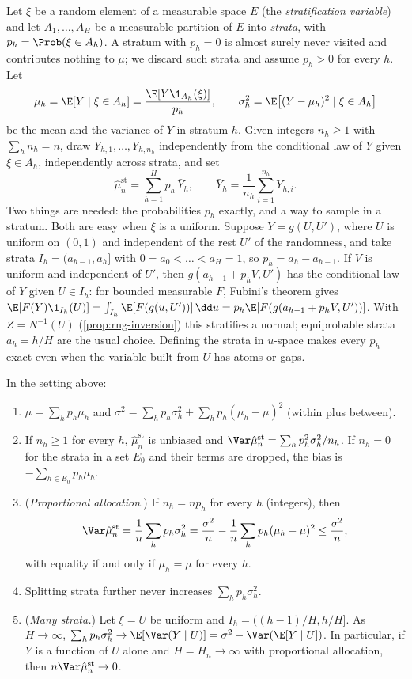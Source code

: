 Let $\xi$ be a random element of a measurable space $E$ (the \emph{stratification
variable}) and let $A_1,\dots,A_H$ be a measurable partition of $E$ into \emph{strata}, with
$p_h=\Prob(\xi\in A_h)$. A stratum with $p_h=0$ is almost surely never visited and
contributes nothing to $\mu$; we discard such strata and assume $p_h>0$ for every $h$. Let
\[
  \mu_h=\E[Y\mid\xi\in A_h]=\frac{\E[Y\1_{A_h}(\xi)]}{p_h},\qquad
  \sigma_h^2=\E\big[(Y-\mu_h)^2\mid\xi\in A_h\big]
\]
be the mean and the variance of $Y$ in stratum $h$. Given integers $n_h\ge1$ with
$\sum_hn_h=n$, draw $Y_{h,1},\dots,Y_{h,n_h}$ independently from the conditional law of $Y$
given $\xi\in A_h$, independently across strata, and set
\begin{equation}\label{eq:st-estimator}
  \hat\mu^{\mathrm{st}}_n=\sum_{h=1}^Hp_h\,\bar Y_h,\qquad \bar Y_h=\frac1{n_h}\sum_{i=1}^{n_h}Y_{h,i}.
\end{equation}
Two things are needed: the probabilities $p_h$ exactly, and a way to sample in a stratum.
Both are easy when $\xi$ is a uniform. Suppose $Y=g(U,U')$, where $U$ is uniform on $(0,1)$
and independent of the rest $U'$ of the randomness, and take strata
$I_h=(a_{h-1},a_h]$ with $0=a_0<\dots<a_H=1$, so $p_h=a_h-a_{h-1}$. If $V$ is uniform and
independent of $U'$, then $g(a_{h-1}+p_hV,U')$ has the conditional law of $Y$ given
$U\in I_h$: for bounded measurable $F$, Fubini's theorem gives
$\E[F(Y)\1_{I_h}(U)]=\int_{I_h}\E[F(g(u,U'))]\,\dd u=p_h\E[F(g(a_{h-1}+p_hV,U'))]$. With
$Z=N^{-1}(U)$ (\cref{prop:rng-inversion}) this stratifies a normal; equiprobable strata
$a_h=h/H$ are the usual choice. Defining the strata in $u$-space makes every $p_h$ exact
even when the variable built from $U$ has atoms or gaps.

\begin{theorem}\label{thm:st-variance}
In the setting above:
\begin{enumerate}[label=(\roman*)]
  \item $\mu=\sum_hp_h\mu_h$ and
    $\sigma^2=\sum_hp_h\sigma_h^2+\sum_hp_h(\mu_h-\mu)^2$ (within plus between).
  \item If $n_h\ge1$ for every $h$, $\hat\mu^{\mathrm{st}}_n$ is unbiased and
    $\Var\hat\mu^{\mathrm{st}}_n=\sum_hp_h^2\sigma_h^2/n_h$. If $n_h=0$ for the strata in a set
    $E_0$ and their terms are dropped, the bias is $-\sum_{h\in E_0}p_h\mu_h$.
  \item (\emph{Proportional allocation.}) If $n_h=np_h$ for every $h$ (integers), then
    \[
      \Var\hat\mu^{\mathrm{st}}_n=\frac1n\sum_hp_h\sigma_h^2=\frac{\sigma^2}n-\frac1n\sum_hp_h(\mu_h-\mu)^2\le\frac{\sigma^2}{n},
    \]
    with equality if and only if $\mu_h=\mu$ for every $h$.
  \item Splitting strata further never increases $\sum_hp_h\sigma_h^2$.
  \item (\emph{Many strata.}) Let $\xi=U$ be uniform and $I_h=((h-1)/H,h/H]$. As
    $H\to\infty$, $\sum_hp_h\sigma_h^2\to\E[\Var(Y\mid U)]=\sigma^2-\Var(\E[Y\mid U])$. In
    particular, if $Y$ is a function of $U$ alone and $H=H_n\to\infty$ with proportional
    allocation, then $n\Var\hat\mu^{\mathrm{st}}_n\to0$.
\end{enumerate}
\end{theorem}

